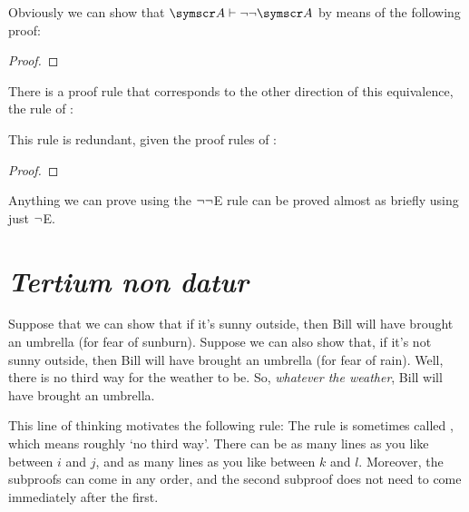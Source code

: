 Obviously we can show that $\meta{A} \proves \enot\enot\meta{A}$ by means of the following proof:
\begin{proof}
\open
{}
\close
{}	
\end{proof}

There is a proof rule that corresponds to the other direction of this equivalence, the rule of :


This rule is redundant, given the proof rules of \TFL: \begin{proof}
	\open
	\close
\end{proof}
Anything we can prove using the $\neg\neg$E rule can be proved almost as briefly using just $\neg$E.



\section{\emph{Tertium non datur}}\label{aprtnd}

Suppose that we can show that if it's sunny outside, then Bill will have brought an umbrella (for fear of sunburn). Suppose we can also show that, if it's not sunny outside, then Bill will have brought an umbrella (for fear of rain). Well, there is no third way for the weather to be. So, \emph{whatever the weather}, Bill will have brought an umbrella. 

This line of thinking motivates the following rule:
The rule is sometimes called , which means roughly `no third way'. There can be as many lines as you like between $i$ and $j$, and as many lines as you like between $k$ and $l$. Moreover, the subproofs can come in any order, and the second subproof does not need to come immediately after the first.

